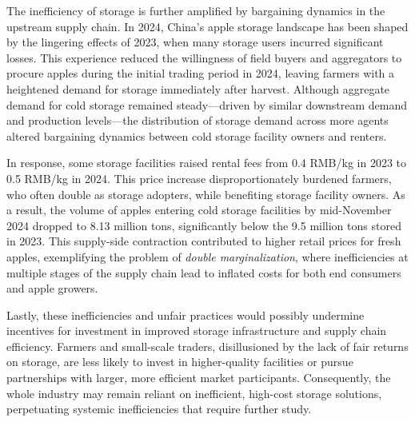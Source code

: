 The inefficiency of storage is further amplified by bargaining dynamics in the upstream supply chain. In 2024, China's apple storage landscape has been shaped by the lingering effects of 2023, when many storage users incurred significant losses. This experience reduced the willingness of field buyers and aggregators to procure apples during the initial trading period in 2024, leaving farmers with a heightened demand for storage immediately after harvest. Although aggregate demand for cold storage remained steady—driven by similar downstream demand and production levels—the distribution of storage demand across more agents altered bargaining dynamics between cold storage facility owners and renters.

In response, some storage facilities raised rental fees from 0.4 RMB/kg in 2023 to 0.5 RMB/kg in 2024. This price increase disproportionately burdened farmers, who often double as storage adopters, while benefiting storage facility owners. As a result, the volume of apples entering cold storage facilities by mid-November 2024 dropped to 8.13 million tons, significantly below the 9.5 million tons stored in 2023. This supply-side contraction contributed to higher retail prices for fresh apples, exemplifying the problem of \textit{double marginalization}, where inefficiencies at multiple stages of the supply chain lead to inflated costs for both end consumers and apple growers.

Lastly, these inefficiencies and unfair practices would possibly undermine incentives for investment in improved storage infrastructure and supply chain efficiency. Farmers and small-scale traders, disillusioned by the lack of fair returns on storage, are less likely to invest in higher-quality facilities or pursue partnerships with larger, more efficient market participants. Consequently, the whole industry may remain reliant on inefficient, high-cost storage solutions, perpetuating systemic inefficiencies that require further study.
